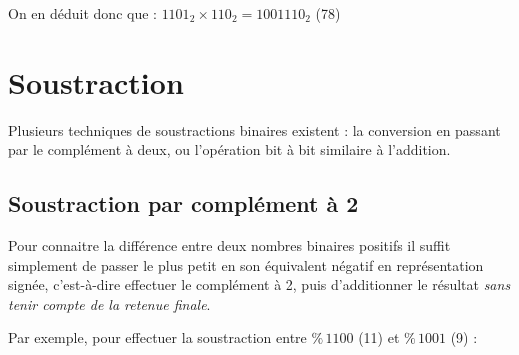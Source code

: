 \documentclass[11pt,a4paper]{article}
\begin{document}
\begin{center}
\begin{table}[ht!]
\begin{minipage}{0.15\textwidth}
  \end{minipage}
\end{table}

\end{center}

On en déduit donc que : $ 1101_{2} \times 110_{2} = 1001110_{2} $ (78)


\clearpage


\section{Soustraction}

\medskip

Plusieurs techniques de soustractions binaires existent : la conversion en passant par le complément à deux, ou l'opération bit à bit similaire à l'addition.


\vfillFirst

\subsection{Soustraction par complément à 2}

\smallskip

Pour connaitre la différence entre deux nombres binaires positifs il suffit simplement de passer le plus petit en son équivalent négatif en représentation signée, c'est-à-dire effectuer le complément à 2, puis d'additionner le résultat \textit{sans tenir compte de la retenue finale}.

\medskip

Par exemple, pour effectuer la soustraction entre $ \% \, 1100 $ (11) et $ \% \, 1001 $ (9) :
\end{document}
